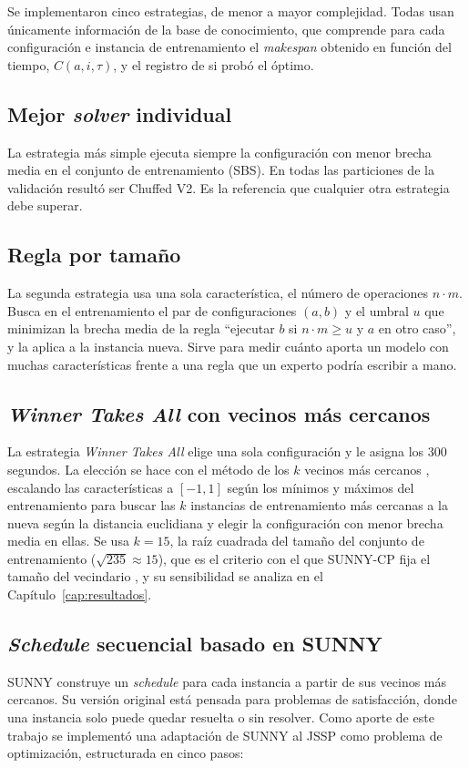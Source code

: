 Se implementaron cinco estrategias, de menor a mayor complejidad. Todas usan
únicamente información de la base de conocimiento, que comprende para cada
configuración e instancia de entrenamiento el \textit{makespan} obtenido en
función del tiempo, $C(a, i, \tau)$, y el registro de si probó el óptimo.

\subsection{Mejor \textit{solver} individual}
La estrategia más simple ejecuta siempre la configuración con menor brecha
media en el conjunto de entrenamiento (SBS). En todas las particiones de la
validación resultó ser Chuffed V2. Es la referencia que cualquier otra estrategia
debe superar.

\subsection{Regla por tamaño}
La segunda estrategia usa una sola característica, el número de operaciones
$n \cdot m$. Busca en el entrenamiento el par de configuraciones $(a, b)$ y el
umbral $u$ que minimizan la brecha media de la regla ``ejecutar $b$ si
$n \cdot m \ge u$ y $a$ en otro caso'', y la aplica a la instancia nueva.
Sirve para medir cuánto aporta un modelo con muchas características frente a
una regla que un experto podría escribir a mano.

\subsection{\textit{Winner Takes All} con vecinos más cercanos}
\label{sec:wta}
La estrategia \textit{Winner Takes All} elige una sola configuración y le
asigna los 300 segundos. La elección se hace con el método de los $k$
vecinos más cercanos \citep{cover1967}, escalando las características a
$[-1, 1]$ según los mínimos y máximos del entrenamiento para buscar las $k$
instancias de entrenamiento más cercanas a la nueva según la distancia
euclidiana y elegir la configuración con menor brecha media en ellas. Se usa
$k = 15$, la raíz cuadrada del tamaño del conjunto de entrenamiento
($\sqrt{235} \approx 15$), que es el criterio con el que SUNNY-CP fija el
tamaño del vecindario \citep{amadini2015sunnycp}, y su sensibilidad se
analiza en el Capítulo~\ref{cap:resultados}.

\subsection{\textit{Schedule} secuencial basado en SUNNY}
\label{sec:sunny}
SUNNY \citep{amadini2014sunny, amadini2015sunnycp} construye un
\textit{schedule} para cada instancia a partir de sus vecinos más cercanos.
Su versión original está pensada para problemas de satisfacción, donde una
instancia solo puede quedar resuelta o sin resolver. Como aporte de este
trabajo se implementó una adaptación de SUNNY al JSSP como problema de
optimización, estructurada en cinco pasos:

